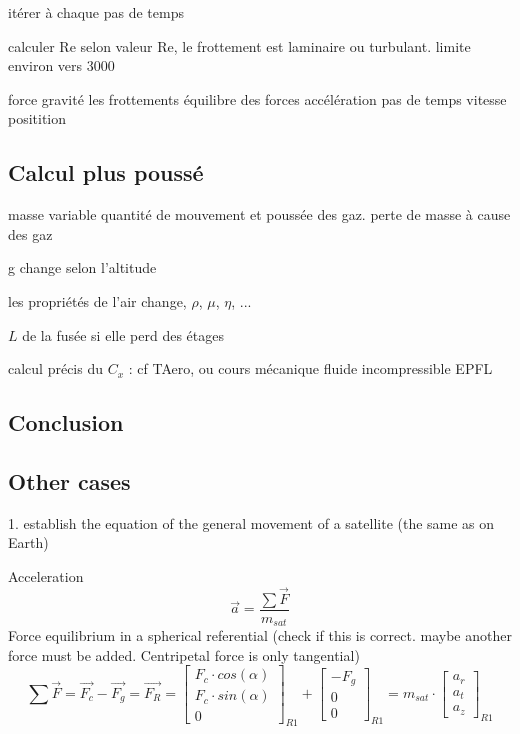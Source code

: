 \documentclass[12pt,a4paper]{article}
\begin{document}
itérer à chaque pas de temps

calculer Re
selon valeur Re, le frottement est laminaire ou turbulant. limite environ vers 3000

force gravité
les frottements
équilibre des forces
accélération
pas de temps
vitesse 
positition

\subsection{Calcul plus poussé}
masse variable
quantité de mouvement et poussée des gaz. perte de masse à cause des gaz

g change selon l'altitude

les propriétés de l'air change, $\rho$, $\mu$, $\eta$, ...

$L$ de la fusée si elle perd des étages

calcul précis du $C_x$ : cf TAero, ou cours mécanique fluide incompressible EPFL
\subsection{Conclusion}

\subsection{Other cases}
1. establish the equation of the general movement of a satellite (the same as on Earth)

Acceleration
\begin{equation}
	\vec{a}=\frac{\sum \vec{F}}{m_{sat}}
\end{equation}
Force equilibrium in a spherical referential (check if this is correct. maybe another force must be added. Centripetal force is only tangential)
\begin{equation}
	\sum \vec{F}=\vec{F_{c}}-\vec{F_g} = \vec{F_R} = 
	\begin{bmatrix}
		F_c\cdot cos(\alpha) \\
		F_c\cdot sin(\alpha)\\
		0
	\end{bmatrix}_{R1} + 
	\begin{bmatrix}
		- F_g \\
		0\\
		0
	\end{bmatrix}_{R1} = m_{sat} \cdot	\begin{bmatrix}
		a_r \\
		a_t\\
		a_z
	\end{bmatrix}_{R1}
\end{equation}
\end{document}
